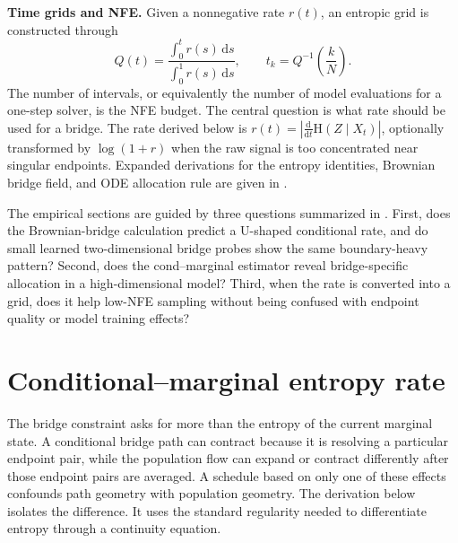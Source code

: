 \documentclass{article}
\newcommand{\Ent}{\mathrm{H}}
\newcommand{\dd}{\mathrm{d}}
\theoremstyle{plain}
\theoremstyle{definition}
\theoremstyle{remark}
\begin{document}
\textbf{Time grids and NFE.} Given a nonnegative rate $r(t)$, an entropic grid is constructed through
\begin{equation}
  Q(t)=\frac{\int_0^t r(s)\,\dd s}{\int_0^1 r(s)\,\dd s},
  \qquad
  t_k=Q^{-1}\!\left(\frac{k}{N}\right).
  \label{eq:inverse_cdf}
\end{equation}
The number of intervals, or equivalently the number of model evaluations for a one-step solver, is the NFE budget. The central question is what rate should be used for a bridge. The rate derived below is $r(t)=|\frac{\dd}{\dd t}\Ent(Z\mid X_t)|$, optionally transformed by $\log(1+r)$ when the raw signal is too concentrated near singular endpoints. Expanded derivations for the entropy identities, Brownian bridge field, and ODE allocation rule are given in .

The empirical sections are guided by three questions summarized in . First, does the Brownian-bridge calculation predict a U-shaped conditional rate, and do small learned two-dimensional bridge probes show the same boundary-heavy pattern? Second, does the cond--marginal estimator reveal bridge-specific allocation in a high-dimensional model? Third, when the rate is converted into a grid, does it help low-NFE sampling without being confused with endpoint quality or model training effects?



\section{Conditional--marginal entropy rate}
\label{sec:theory}

The bridge constraint asks for more than the entropy of the current marginal state. A conditional bridge path can contract because it is resolving a particular endpoint pair, while the population flow can expand or contract differently after those endpoint pairs are averaged. A schedule based on only one of these effects confounds path geometry with population geometry. The derivation below isolates the difference. It uses the standard regularity needed to differentiate entropy through a continuity equation.
\end{document}
